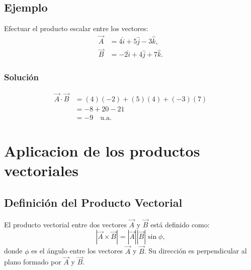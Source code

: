 \subsection{Ejemplo}
Efectuar el producto escalar entre los vectores:
\begin{align*}
\vec{A} &= 4\hat{i} + 5\hat{j} - 3\hat{k}, \\
\vec{B} &= -2\hat{i} + 4\hat{j} + 7\hat{k}.
\end{align*}

\subsubsection{Solución}
\begin{align*}
\vec{A} \cdot \vec{B} &= (4)(-2) + (5)(4) + (-3)(7) \\
&= -8 + 20 - 21 \\
&= -9 \quad \text{u.a.}
\end{align*}

\newpage
\section{Aplicacion de los productos vectoriales}

\subsection{Definición del Producto Vectorial}
El producto vectorial entre dos vectores $\vec{A}$ y $\vec{B}$ está definido como:
\begin{equation}
    |\vec{A} \times \vec{B}| = |\vec{A}| |\vec{B}| \sin \phi,
\end{equation}
donde $\phi$ es el ángulo entre los vectores $\vec{A}$ y $\vec{B}$. Su dirección es perpendicular al plano formado por $\vec{A}$ y $\vec{B}$.

\begin{center}
\end{center}

